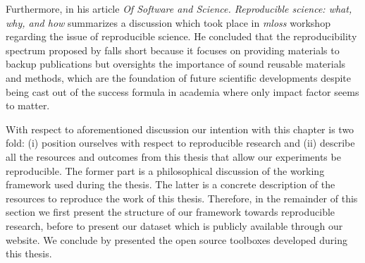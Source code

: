 Furthermore, \citeauthor{varoquaux2015Software} in his article %
\emph{Of Software and Science. Reproducible science: what, why, and how} summarizes a discussion which took place in \emph{\acs{mloss}} workshop regarding the issue of reproducible science.
He concluded that the reproducibility spectrum proposed by \citeauthor{peng2011reproducible} falls short because it focuses on providing materials to backup publications but oversights the importance of sound reusable materials and methods, which are the foundation of future scientific developments despite being cast out of the success formula in academia where only impact factor seems to matter.

With respect to aforementioned discussion our intention with this chapter is two fold: (i) position ourselves with respect to reproducible research and (ii) describe all the resources and outcomes from this thesis that allow our experiments be reproducible.
The former part is a philosophical discussion of the working framework used during the thesis. 
The latter is a concrete description of the resources to reproduce the work of this thesis.
Therefore, in the remainder of this section we first present the structure of our framework towards reproducible research, before to present our dataset which is publicly available through our website.
We conclude by presented the open source toolboxes developed during this thesis.

